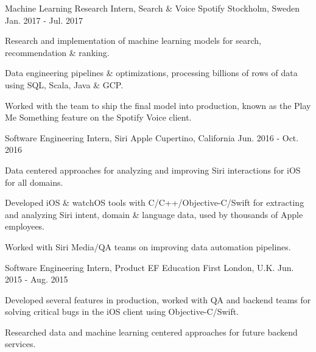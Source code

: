\begin{cventries}
  \cventry
    {Machine Learning Research Intern, Search \& Voice} %
    {Spotify} %
    {Stockholm, Sweden} %
    {Jan. 2017 - Jul. 2017} %
    {
      \begin{cvitems} %
        \item {Research and implementation of machine learning models for search, recommendation \& ranking.}
        \item {Data engineering pipelines \& optimizations, processing billions of rows of data using SQL, Scala, Java \& GCP.}
        \item {Worked with the team to ship the final model into production, known as the Play Me Something feature on the Spotify Voice client.}
      \end{cvitems}
    }

  \cventry
    {Software Engineering Intern, Siri} %
    {Apple} %
    {Cupertino, California} %
    {Jun. 2016 - Oct. 2016} %
    {
      \begin{cvitems} %
        \item {Data centered approaches for analyzing and improving Siri interactions for iOS for all domains.}
        \item {Developed iOS \& watchOS tools with C/C++/Objective-C/Swift for extracting and analyzing Siri intent, domain \& language data, used by thousands of Apple employees.}
        \item {Worked with Siri Media/QA teams on improving data automation pipelines.}
      \end{cvitems}
    }

  \cventry
    {Software Engineering Intern, Product} %
    {EF Education First} %
    {London, U.K.} %
    {Jun. 2015 - Aug. 2015} %
    {
      \begin{cvitems} %
      \item {Developed several features in production, worked with QA and backend teams for solving critical bugs in the iOS client using Objective-C/Swift.}
      \item {Researched data and machine learning centered approaches for future backend services.}
      \end{cvitems}
    }


\end{cventries}
